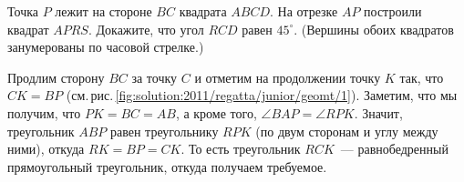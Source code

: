 Точка $P$ лежит на стороне $BC$ квадрата $ABCD$.
На отрезке $AP$ построили квадрат $APRS$.
Докажите, что угол $RCD$ равен $45^\circ$.
(Вершины обоих квадратов занумерованы по часовой стрелке.)



%
\label{solution:2011/regatta/junior/geomt/1}%
Продлим сторону $BC$ за точку $C$ и отметим на продолжении точку $K$ так, что
$C K = B P$
(см.\,рис.\,\ref{fig:solution:2011/regatta/junior/geomt/1}).
Заметим, что мы получим, что $PK = BC = AB$, а кроме того,
$\angle BAP = \angle RPK$.
Значит, треугольник $ABP$ равен треугольнику $RPK$
(по двум сторонам и углу между ними),
откуда $RK = BP = CK$.
То есть треугольник $RCK$~--- равнобедренный прямоугольный треугольник, откуда
получаем требуемое.

